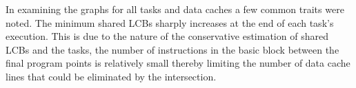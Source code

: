%
%
%
%
%
%
%
%
%
%
%
%
%
%

In examining the graphs for all tasks and data caches a few common traits were noted. The minimum shared LCBs sharply increases at the end of each task's execution. This is due to the nature of the conservative estimation of shared LCBs and the tasks, the number of instructions in the basic block between the final program points is relatively small thereby limiting the number of data cache lines that could be eliminated by the intersection.
%

